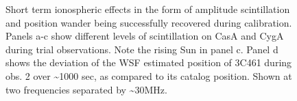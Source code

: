 \documentclass{aa}
\begin{document}
\begin{figure}[tbh]

\caption{\label{fig:Estimated-flux-of}Short term ionospheric effects in the form
  of amplitude  scintillation and  position wander being  successfully recovered
  during calibration. Panels a-c show  different levels of scintillation on CasA
  and CygA  during trial observations. Note the  rising Sun in panel  c. Panel d
  shows the deviation of the WSF  estimated position of 3C461 during obs. 2 over
  \textasciitilde{}1000 sec, as  compared to its catalog position.  Shown at two
  frequencies separated by \textasciitilde{}30MHz.}
\end{figure}
\end{document}
